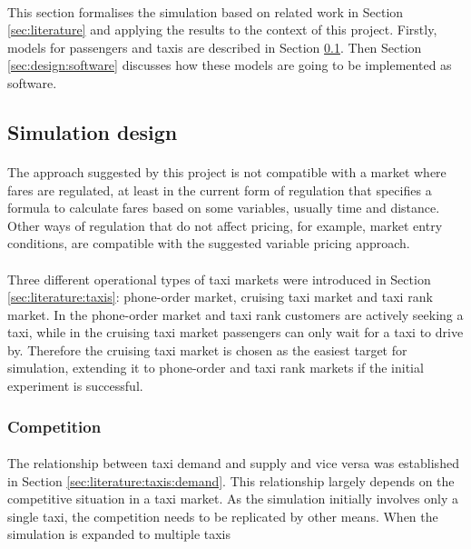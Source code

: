 \paragraph{} This section formalises the simulation based on related work in
Section \ref{sec:literature} and applying the results to the context of this
project. Firstly, models for passengers and taxis are described in Section
\ref{sec:design:simulation}. Then Section \ref{sec:design:software} discusses
how these models are going to be implemented as software.

\subsection{Simulation design}
\label{sec:design:simulation}

\paragraph{} The approach suggested by this project is not
compatible with a market where fares are regulated, at least in the current
form of regulation that specifies a formula to calculate fares based on some
variables, usually time and distance. Other ways of regulation that do not
affect pricing, for example, market entry conditions, are compatible with the
suggested variable pricing approach.

\paragraph{}Three different operational types of taxi markets were introduced
in Section \ref{sec:literature:taxis}: phone-order market, cruising taxi market
and taxi rank market. In the phone-order market and taxi rank customers are
actively seeking a taxi, while in the cruising taxi market passengers can only
wait for a taxi to drive by. Therefore the cruising taxi market is chosen as
the easiest target for simulation, extending it to phone-order and taxi rank
markets if the initial experiment is successful.


\subsubsection{Competition}

\paragraph{} The relationship between taxi demand and supply and vice versa was
established in Section \ref{sec:literature:taxis:demand}. This relationship
largely depends on the competitive situation in a taxi market. As the
simulation initially involves only a single taxi, the competition needs to be
replicated by other means. When the simulation is expanded to multiple taxis

